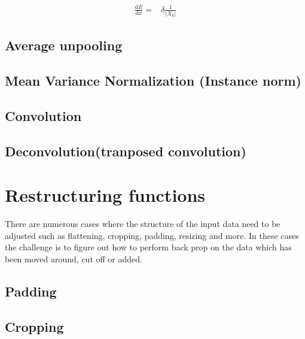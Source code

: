 \documentclass[a4paper]{article}
\begin{document}
\begin{align}
\frac{\mathrm{d} E }{\mathrm{d} x}= &\delta \frac{1}{|X_k|}
\end{align}


\subsection{Average unpooling}
\subsection{Mean Variance Normalization (Instance norm)}
\subsection{Convolution}
\subsection{Deconvolution(tranposed convolution)}

\newpage
\section{Restructuring functions}
There are numerous cases where the structure of the input data need to be adjusted such as flattening, cropping, padding, resizing and more. In these cases the challenge is to figure out how to perform back prop on the data which has been moved around, cut off or added. 
\subsection{Padding}
\subsection{Cropping}
\end{document}
